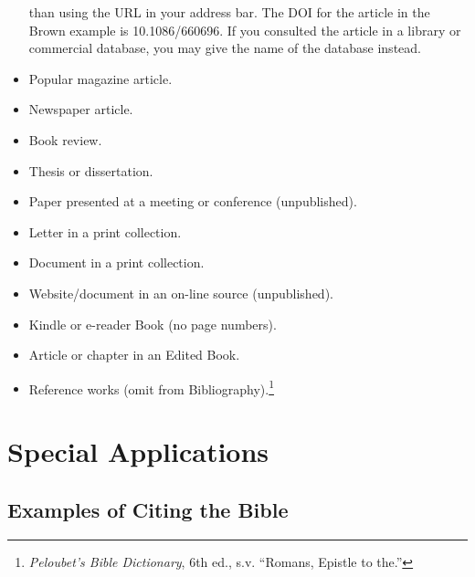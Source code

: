 \documentclass[raggedright]{turabian-researchpaper}
\begin{document}
\begin{itemize}
{  than using the URL in your address bar. The DOI for the article in the Brown
  example is 10.1086/660696. If you consulted the article in a library or
  commercial database, you may give the name of the database instead.}
\item Popular magazine article.\autocite[84]{Martin}
\item Newspaper article.\autocite{Niederkorn}
\item Book review.\autocite[16]{Gorman}
\item Thesis or dissertation.\autocite[22--29, 35]{Amundin}
\item Paper presented at a meeting or conference (unpublished).\autocite{Doyle}
\item Letter in a print collection.\autocite[1: 199-200]{Roberts}
\item Document in a print collection.\autocite[6: 19-23]{Leigh}
\item Website/document in an on-line source (unpublished).\autocite{Deane}
\item Kindle or e-reader Book (no page numbers).\autocite[loc. 103]{Earley}
\item Article or chapter in an Edited Book.\autocite[68]{Bulgakov}
\item Reference works (omit from Bibliography).\footnote{\textit{Peloubet's
  Bible Dictionary}, 6th ed., s.v. ``Romans, Epistle to the.''}
\end{itemize}

\section{Special Applications}

\subsection{Examples of Citing the Bible}
\end{document}
